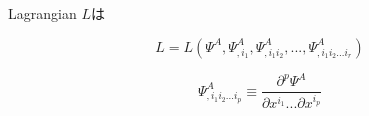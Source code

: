 \documentclass[dvipdfmx,a4]{jsarticle}
\title{}
\author{中越一磨}
\begin{document}
\maketitle

\section{}
Lagrangian \(L\)は

\begin{equation}
  L=L(\Psi ^A, \Psi ^A _{,i_1}, \Psi ^A _{,i_1 i_2}, ... , \Psi ^A _{,i_1 i_2 ... i_r})
\end{equation} 

\begin{equation}
  \Psi ^A _{,i_1 i_2 ... i_p} \equiv  \dfrac{\partial ^p \Psi^A}{\partial x^{i_1} ...\partial x^{i_p}}
\end{equation}
\begin{thebibliography}{9}
\end{thebibliography}
\end{document}
